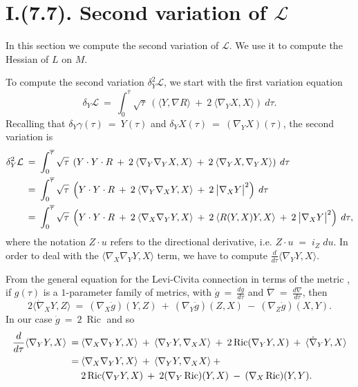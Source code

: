 \documentclass[12pt]{amsart}
\newcommand{\Ric}{\operatorname{Ric}}
\numberwithin{equation}{section}
\theoremstyle{plain}
\theoremstyle{definition}
\theoremstyle{remark}
\begin{document}
\section{I.(7.7). Second variation of ${\mathcal L}$}


In this section we compute the second variation of ${\mathcal L}$.
We use it to compute the Hessian of $L$ on $M$.


To compute the second variation $\delta_Y^2 {\mathcal L}$, we start with
the first variation equation
\begin{equation}
\delta_Y {\mathcal L} \: = \:
\int_{0}^{\overline{\tau}} \sqrt{\tau} \: \left( \langle Y, \nabla R \rangle
\: + \: 2 \: \langle \nabla_Y X, X \rangle \right) \: d\tau.
\end{equation}
Recalling that $\delta_Y \gamma(\tau) \: =\: Y(\tau)$ and 
$\delta_Y X(\tau) \: = \: (\nabla_Y X)(\tau)$,
the second variation is
\begin{align}
\delta_Y^2 {\mathcal L} \: & = \:
\int_{0}^{\overline{\tau}} \sqrt{\tau} \: \left( Y \cdot Y \cdot R
\: + \: 2 \: \langle \nabla_Y \nabla_Y X, X \rangle 
\: + \: 2 \: \langle \nabla_Y X, \nabla_Y X \rangle \right) \: d\tau \\
& = \: 
\int_{0}^{\overline{\tau}} \sqrt{\tau} \: \left( Y \cdot Y \cdot R
\: + \: 2 \: \langle \nabla_Y \nabla_X Y, X \rangle 
\: + \: 2 \: \big| \nabla_X Y \big|^2 \right) \: d\tau \notag \\
& = \: 
\int_{0}^{\overline{\tau}} \sqrt{\tau} \: \left( Y \cdot Y \cdot R
\: + \: 2 \: \langle \nabla_X \nabla_Y Y, X \rangle
\: + \: 2 \: \langle R(Y, X) Y, X \rangle 
\: + \: 2 \: \big| \nabla_X Y \big|^2 \right) \: d\tau, \notag
\end{align}
where the notation $Z \cdot u$ refers to the directional derivative, i.e.
$Z\cdot u\;=\; i_Z\;du$.
In order to deal with the $\langle \nabla_X \nabla_Y Y, X \rangle$ term,
we have to compute $\frac{d}{d\tau} \langle \nabla_Y Y, X \rangle$.

From the general equation for the Levi-Civita
connection in terms of the metric
\cite[(1.29)]{Chavel}, if $g(\tau)$ is a $1$-parameter family of metrics,
with $\dot{g} \: = \: \frac{dg}{d\tau}$
and $\dot{\nabla} \: = \: \frac{d\nabla}{d\tau}$, then
\begin{equation}
2 \langle \dot{\nabla}_X Y, Z \rangle \: = \:
(\nabla_X \dot{g}) (Y, Z) \: + \:
(\nabla_Y \dot{g}) (Z, X) \: - \:
(\nabla_Z \dot{g}) (X, Y).
\end{equation}
In our case $\dot{g} \: = \: 2 \: \Ric$ and so
\begin{align} \label{xxx}
\frac{d}{d\tau} \langle \nabla_Y Y, X \rangle \: = \: &
\langle \nabla_X \nabla_Y Y, X \rangle \: + \:
\langle \nabla_Y Y, \nabla_X X \rangle \: + \:
2 \Ric ( \nabla_Y Y, X ) \: + \:
\langle \dot{\nabla}_Y Y, X \rangle \\
 = \: &
\langle \nabla_X \nabla_Y Y, X \rangle \: + \:
\langle \nabla_Y Y, \nabla_X X \rangle \: + \notag \\
& 2 \Ric ( \nabla_Y Y, X ) \: + \:
2 (\nabla_Y \Ric) (Y, X) \: - \:
(\nabla_X \Ric) (Y, Y). \notag
\end{align}
\end{document}
